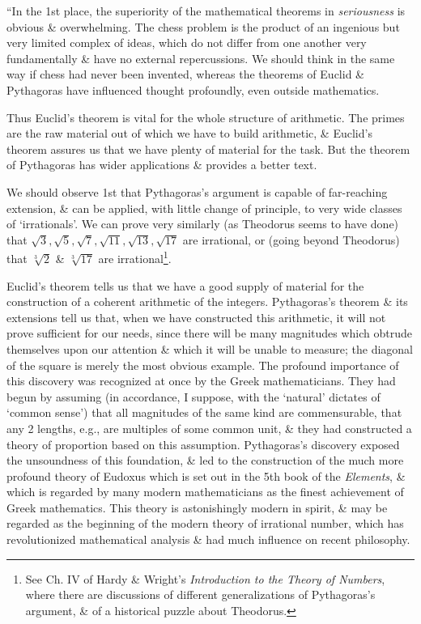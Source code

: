 \documentclass{article}
\numberwithin{equation}{section}
\begin{document}
 ``In the 1st place, the superiority of the mathematical theorems in \textit{seriousness} is obvious \& overwhelming. The chess problem is the product of an ingenious but very limited complex of ideas, which do not differ from one another very fundamentally \& have no external repercussions. We should think in the same way if chess had never been invented, whereas the theorems of Euclid \& Pythagoras have influenced thought profoundly, even outside mathematics.

Thus Euclid's theorem is vital for the whole structure of arithmetic. The primes are the raw material out of which we have to build arithmetic, \& Euclid's theorem assures us that we have plenty of material for the task. But the theorem of Pythagoras has wider applications \& provides a better text.

We should observe 1st that Pythagoras's argument is capable of far-reaching extension, \& can be applied, with little change of principle, to very wide classes of `irrationals'. We can prove very similarly (as Theodorus seems to have done) that $\sqrt{3},\sqrt{5},\sqrt{7},\sqrt{11},\sqrt{13},\sqrt{17}$ are irrational, or (going beyond Theodorus) that $\sqrt[3]{2}$ \& $\sqrt[3]{17}$ are irrational\footnote{See Ch. IV of Hardy \& Wright's \textit{Introduction to the Theory of Numbers}, where there are discussions of different generalizations of Pythagoras's argument, \& of a historical puzzle about Theodorus.}.

Euclid's theorem tells us that we have a good supply of material for the construction of a coherent arithmetic of the integers. Pythagoras's theorem \& its extensions tell us that, when we have constructed this arithmetic, it will not prove sufficient for our needs, since there will be many magnitudes which obtrude themselves upon our attention \& which it will be unable to measure; the diagonal of the square is merely the most obvious example. The profound importance of this discovery was recognized at once by the Greek mathematicians. They had begun by assuming (in accordance, I suppose, with the `natural' dictates of `common sense') that all magnitudes of the same kind are commensurable, that any 2 lengths, e.g., are multiples of some common unit, \& they had constructed a theory of proportion based on this assumption. Pythagoras's discovery exposed the unsoundness of this foundation, \& led to the construction of the much more profound theory of Eudoxus which is set out in the 5th book of the \textit{Elements}, \& which is regarded by many modern mathematicians as the finest achievement of Greek mathematics. This theory is astonishingly modern in spirit, \& may be regarded as the beginning of the modern theory of irrational number, which has revolutionized mathematical analysis \& had much influence on recent philosophy.
\end{document}
